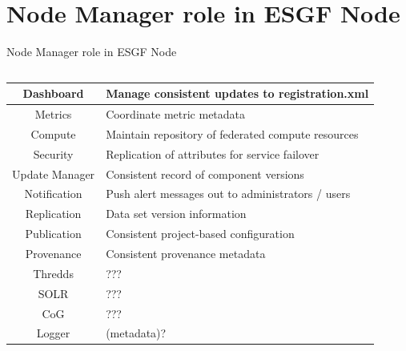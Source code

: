 \documentclass{beamer}
\begin{document}
\section{Node Manager role in ESGF Node}
\begin{frame}{Node Manager role in ESGF Node}

\begin{columns}
\begin{column}{.5\linewidth}

\tiny
\begin{tabularx}{6cm}{|c|X|}

\hline
Dashboard &  Manage consistent updates to registration.xml \\
\hline
Metrics & Coordinate metric metadata \\
\hline
Compute & Maintain repository of federated compute resources \\
\hline
Security & Replication of attributes for service failover \\
\hline
Update Manager & Consistent record of component versions \\
\hline
Notification & Push alert messages out to administrators / users \\
\hline
Replication & Data set version information \\
\hline
Publication & Consistent project-based configuration \\
\hline
Provenance & Consistent provenance metadata \\
\hline
Thredds & ??? \\
\hline
SOLR & ??? \\
\hline
CoG & ??? \\
\hline
Logger & (metadata)? \\
\hline
\end{tabularx}

\end{column}


\end{columns}
\end{frame}
\end{document}
